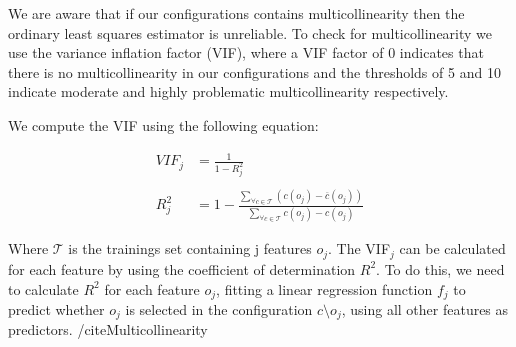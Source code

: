 We are aware that if our configurations contains multicollinearity then the ordinary least squares estimator is unreliable.
To check for multicollinearity we use the variance inflation factor (VIF), where a VIF factor of 0 indicates
that there is no multicollinearity in our configurations and the thresholds of 5 and 10 indicate moderate and highly problematic multicollinearity 
respectively. \cite{Multicollinearity}

We compute the VIF using the following equation:

\begin{align}
    VIF_{j} &= \frac{1}{1 - R^{2}_{j}}  \\ \nonumber\\
    R^{2}_{j} &= 1 - \frac{\sum\limits_{\forall c \in \mathcal{T}} (c(o_j) - \overline{c}(o_j))} {\sum\limits_{\forall c \in \mathcal{T}}c(o_j) - {c}(o_j)}
\end{align}

Where $\mathcal{T}$ is the trainings set containing j features $o_j$. The VIF$_{j}$ can be calculated for each feature by using the coefficient
of determination $R^2$. To do this, we need to calculate $R^2$ for each feature $o_j$, fitting a linear regression function $f_j$ to predict whether $o_j$
is selected in the configuration $c \setminus o_j$, using all other features as predictors. /cite{Multicollinearity}
